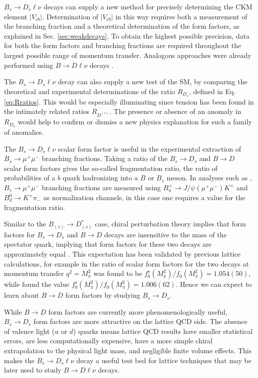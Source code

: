 $B_s\to D_s \ell\nu$ decays can supply a new method for precisely determining the CKM element $|V_{cb}|$. Determination of $|V_{cb}|$ in this way requires both a measurement of the branching fraction and a theoretical determination of the form factors, as explained in Sec. \ref{sec:weakdecays}. To obtain the highest possible precision, data for both the form factors and branching fractions are required throughout the largest possible range of momentum transfer. Analogous approaches were already performed using $B\to D \ell \nu$ decays \cite{Buskulic:1996yq,Bartelt:1998dq,Aubert:2008yv,Aubert:2009ac,Lattice:2015rga,Na:2015kha,Glattauer:2015teq}. 

The $B_s\to D_s \ell\nu$ decay can also supply a new test of the SM, by comparing the theoretical and experimental determinations of the ratio $R_{D_s}$, defined in Eq. \eqref{eq:Rratios}. This would be especially illuminating since tension has been found in the intimately related ratios $R_{D^{(*)}}$. The presence or absence of an anomaly in $R_{D_s}$ would help to confirm or dismiss a new physics explanation for such a family of anomalies.

The $B_s\to D_s \ell\nu$ scalar form factor is useful in the experimental extraction of $B_s \to \mu^+\mu^-$ branching fractions. Taking a ratio of the $B_s\to D_s$ and $B\to D$ scalar form factors gives the so-called fragmentation ratio, the ratio of probabilities of a $b$ quark hadronizing into a $B$ or $B_s$ meson. In analyses such as \cite{CMS:2014xfa}, $B_s \to \mu^+\mu^-$ branching fractions are measured using $B_u^+\to J/\psi(\mu^+\mu^-)K^+$ and $B_d^0\to K^+\pi_-$ as normalization channels, in this case one requires a value for the fragmentation ratio.

Similar to the $B_{(s)}\to D_{(s)}^*$ case, chiral perturbation theory implies that form factors for $B_s \to D_s$ and $B \to D$ decays are insensitive to the mass of the spectator quark, implying that form factors for these two decays are approximately equal \cite{Laiho:2005ue}. This expectation has been validated by previous lattice calculations, for example in \cite{PhysRevD.85.114502} the ratio of scalar form factors for the two decays at momentum transfer $q^2=M^2_{\pi}$ was found to be $f^s_0(M_{\pi}^2)/f_0(M_{\pi}^2) = 1.054(50)$, while \cite{Monahan:2017uby} found the value $f^s_0(M_{\pi}^2)/f_0(M_{\pi}^2) = 1.006(62)$. Hence we can expect to learn about $B\to D$ form factors by studying $B_s\to D_s$. 

While $B\to D$ form factors are currently more phenomenologically useful, $B_s\to D_s$ form factors are more attractive on the lattice QCD side. The absence of valence light ($u$ or $d$) quarks means lattice QCD results have smaller statistical errors, are less computationally expensive, have a more simple chiral extrapolation to the physical light mass, and negligible finite volume effects. This makes the $B_s \to D_s \ell\nu$ decay a useful test bed for lattice techniques that may be later used to study $B \to D \ell \nu$ decays.

